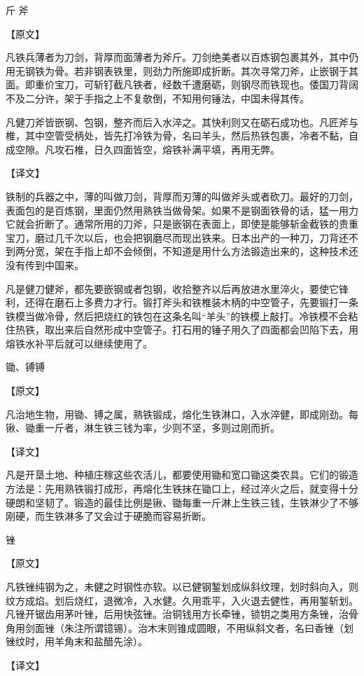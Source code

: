 \documentclass[12pt,UTF8]{ctexbook}
\begin{document}
斤 斧

【原文】

凡铁兵薄者为刀剑，背厚而面薄者为斧斤。刀剑绝美者以百炼钢包裹其外，其中仍用无钢铁为骨。若非钢表铁里，则劲力所施即成折断。其次寻常刀斧，止嵌钢于其面。即重价宝刀，可斩钉截凡铁者，经数千遭磨砺，则钢尽而铁现也。倭国刀背阔不及二分许，架于手指之上不复欹倒，不知用何锤法，中国未得其传。

凡健刀斧皆嵌钢、包钢，整齐而后入水淬之。其快利则又在砺石成功也。凡匠斧与椎，其中空管受柄处，皆先打冷铁为骨，名曰羊头，然后热铁包裹，冷者不黏，自成空隙。凡攻石椎，日久四面皆空，熔铁补满平填，再用无弊。

【译文】

铁制的兵器之中，薄的叫做刀剑，背厚而刃薄的叫做斧头或者砍刀。最好的刀剑，表面包的是百炼钢，里面仍然用熟铁当做骨架。如果不是钢面铁骨的话，猛一用力它就会折断了。通常所用的刀斧，只是嵌钢在表面上，即使是能够斩金截铁的贵重宝刀，磨过几千次以后，也会把钢磨尽而现出铁来。日本出产的一种刀，刀背还不到两分宽，架在手指上却不会倾倒，不知道是用什么方法锻造出来的，这种技术还没有传到中国来。

凡是健刀健斧，都先要嵌钢或者包钢，收拾整齐以后再放进水里淬火，要使它锋利，还得在磨石上多费力才行。锻打斧头和铁椎装木柄的中空管子，先要锻打一条铁模当做冷骨，然后把烧红的铁包在这条名叫“羊头”的铁模上敲打。冷铁模不会粘住热铁，取出来后自然形成中空管子。打石用的锤子用久了四面都会凹陷下去，用熔铁水补平后就可以继续使用了。

锄、镈镈

【原文】

凡治地生物，用锄、镈之属，熟铁锻成，熔化生铁淋口，入水淬健，即成刚劲。每锹、锄重一斤者，淋生铁三钱为率，少则不坚，多则过刚而折。

【译文】

凡是开垦土地、种植庄稼这些农活儿，都要使用锄和宽口锄这类农具。它们的锻造方法是：先用熟铁锻打成形，再熔化生铁抹在锄口上，经过淬火之后，就变得十分硬朗和坚韧了。锻造的最佳比例是锹、锄每重一斤淋上生铁三钱，生铁淋少了不够刚硬，而生铁淋多了又会过于硬脆而容易折断。

锉

【原文】

凡铁锉纯钢为之，未健之时钢性亦软。以已健钢錾划成纵斜纹理，划时斜向入，则纹方成焰。划后烧红，退微冷，入水健。久用乖平，入火退去健性，再用錾斩划。凡锉开锯齿用茅叶锉，后用快弦锉。治铜钱用方长牵锉，锁钥之类用方条锉，治骨角用剑面锉（朱注所谓镱锡）。治木末则锥成圆眼，不用纵斜文者，名曰香锉（划锉纹时，用羊角末和盐醋先涂）。

【译文】
\end{document}
